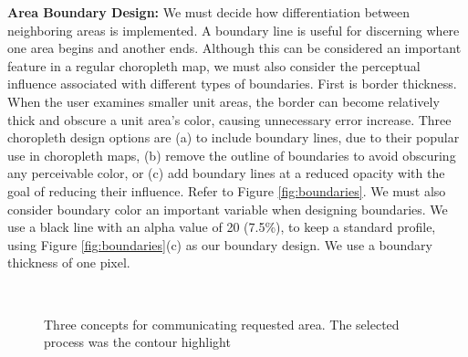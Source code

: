 \textbf{Area Boundary Design: } We must decide how differentiation between neighboring areas is implemented. A boundary line is useful for discerning where one area begins and another ends. Although this can be considered an important feature in a regular choropleth map, we must also consider the perceptual influence associated with different types of boundaries. First is border thickness. When the user examines smaller unit areas, the border can become relatively thick and obscure a unit area's color, causing unnecessary error increase. Three choropleth design options are (a) to include boundary lines, due to their popular use in choropleth maps, (b) remove the outline of boundaries to avoid obscuring any perceivable color, or (c) add boundary lines at a reduced opacity with the goal of reducing their influence. Refer to Figure \ref{fig:boundaries}. We must also consider boundary color an important variable when designing boundaries. We use a black line with an alpha value of 20 (7.5\%), to keep a standard profile, using Figure \ref{fig:boundaries}(c) as our boundary design. We use a boundary thickness of one pixel.

\begin{figure}[t] \centering
{}~
~
\caption{Three concepts for communicating requested area. The selected process was the contour highlight } \label{fig:highlight}
\end{figure}

